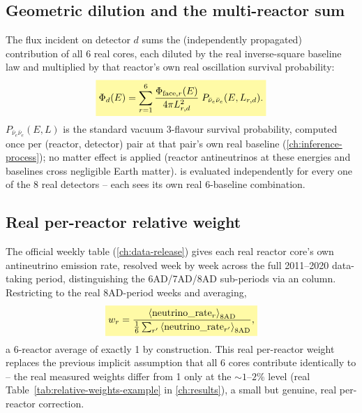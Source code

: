 \begin{theorybox}
\subsection*{Geometric dilution and the multi-reactor sum}
The flux incident on detector $d$ sums the (independently propagated)
contribution of all 6 real cores, each diluted by the real inverse-square
baseline law and multiplied by that reactor's own real oscillation
survival probability:
\begin{equation}
  \keyresult{\Phi_d(E) = \sum_{r=1}^{6}
    \frac{\Phi_{{\rm face},r}(E)}{4\pi L_{r,d}^2}\;
    P_{\bar\nu_e\bar\nu_e}(E,L_{r,d}).}
  \label{eq:dayabay-flux-sum}
\end{equation}
$P_{\bar\nu_e\bar\nu_e}(E,L)$ is the standard vacuum 3-flavour survival
probability, computed once per (reactor, detector) pair at that pair's own
real baseline (\cref{ch:inference-process}); no matter effect is applied
(reactor antineutrinos at these energies and baselines cross negligible
Earth matter).  is evaluated independently for
every one of the 8 real detectors -- each sees its own real 6-baseline
combination.
\end{theorybox}

\subsection*{Real per-reactor relative weight}
\label{sec:weekly-rate-table}

\begin{theorybox}
The official weekly  table (\cref{ch:data-release})
gives each real reactor core's own antineutrino emission rate, resolved
week by week across the full 2011--2020 data-taking period, distinguishing
the 6AD/7AD/8AD sub-periods via an  column. Restricting to the
real 8AD-period weeks and averaging,
\begin{equation}
  \keyresult{w_r = \frac{\left\langle\text{neutrino\_rate}_r\right\rangle_{\rm 8AD}}
    {\frac{1}{6}\sum_{r'} \left\langle\text{neutrino\_rate}_{r'}\right\rangle_{\rm 8AD}},}
  \label{eq:dayabay-relative-weight}
\end{equation}
a 6-reactor average of exactly 1 by construction. This real per-reactor
weight replaces the previous implicit assumption that all 6 cores
contribute identically to  -- the real
measured weights differ from 1 only at the $\sim1$--$2\%$ level (real
Table~\ref{tab:relative-weights-example} in \cref{ch:results}), a small but
genuine, real per-reactor correction.
\end{theorybox}

